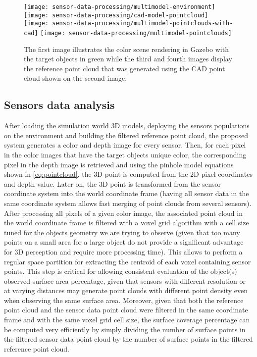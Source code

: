 \begin{figure}
	\centering
	\texttt{[image: sensor-data-processing/multimodel-environment]}\hspace{2em}
	\texttt{[image: sensor-data-processing/cad-model-pointcloud]}
	\texttt{[image: sensor-data-processing/multimodel-pointclouds-with-cad]}\hspace{2em}
	\texttt{[image: sensor-data-processing/multimodel-pointclouds]}
	\caption{The first image illustrates the color scene rendering in Gazebo with the target objects in green while the third and fourth images display the reference point cloud that was generated using the CAD point cloud shown on the second image.}
	\label{fig:reference-cloud}
\end{figure}


\subsection{Sensors data analysis}

After loading the simulation world 3D models, deploying the sensors populations on the environment and building the filtered reference point cloud, the proposed system generates a color and depth image for every sensor. Then, for each pixel in the color images that have the target objects unique color, the corresponding pixel in the depth image is retrieved and using the pinhole model equations shown in \cref{eq:pointcloud}, the 3D point is computed from the 2D pixel coordinates and depth value. Later on, the 3D point is transformed from the sensor coordinate system into the world coordinate frame (having all sensor data in the same coordinate system allows fast merging of point clouds from several sensors). After processing all pixels of a given color image, the associated point cloud in the world coordinate frame is filtered with a voxel grid algorithm with a cell size tuned for the objects geometry we are trying to observe (given that too many points on a small area for a large object do not provide a significant advantage for 3D perception and require more processing time). This allows to perform a regular space partition for extracting the centroid of each voxel containing sensor points. This step is critical for allowing consistent evaluation of the object(s) observed surface area percentage, given that sensors with different resolution or at varying distances may generate point clouds with different point density even when observing the same surface area. Moreover, given that both the reference point cloud and the sensor data point cloud were filtered in the same coordinate frame and with the same voxel grid cell size, the surface coverage percentage can be computed very efficiently by simply dividing the number of surface points in the filtered sensor data point cloud by the number of surface points in the filtered reference point cloud.

